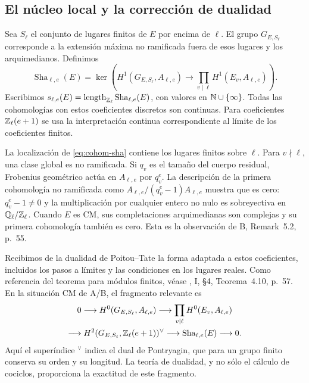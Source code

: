 \subsection{El núcleo local y la corrección de dualidad}

Sea $S_\ell$ el conjunto de lugares finitos de $E$
por encima de $\ell$. El grupo $G_{E,S_\ell}$ corresponde
a la extensión máxima no ramificada fuera de esos lugares
y los arquimedianos. Definimos
\begin{equation}
 \operatorname{Sha}_{\ell,e}(E)=
 \ker\left(
 H^1(G_{E,S_\ell},A_{\ell,e})
 \longrightarrow\prod_{v\mid\ell}H^1(E_v,A_{\ell,e})
 \right).
 \label{eq:cohom-sha}
\end{equation}
Escribimos $s_{\ell,e}(E)=
\operatorname{length}_{\mathbb{Z}_\ell}\operatorname{Sha}_{\ell,e}(E)$,
con valores en $\mathbb{N}\cup\{\infty\}$.
Todas las cohomologías con estos coeficientes discretos
son continuas. Para coeficientes $\mathbb{Z}_\ell(e+1)$ se usa
la interpretación continua correspondiente al límite
de los coeficientes finitos.

La localización de \eqref{eq:cohom-sha} contiene los
lugares finitos sobre $\ell$. Para $v\nmid\ell$,
una clase global es no ramificada. Si $q_v$ es el tamaño
del cuerpo residual, Frobenius geométrico actúa en
$A_{\ell,e}$ por $q_v^e$. La descripción de la primera
cohomología no ramificada como
$A_{\ell,e}/(q_v^e-1)A_{\ell,e}$ muestra que es cero:
$q_v^e-1\ne0$ y la multiplicación por cualquier entero
no nulo es sobreyectiva en $\mathbb{Q}_\ell/\mathbb{Z}_\ell$.
Cuando $E$ es CM, sus completaciones arquimedianas
son complejas y su primera cohomología también es cero.
Esta es la observación de B, Remark~5.2, p.~55.

Recibimos de la dualidad de Poitou--Tate la forma adaptada
a estos coeficientes, incluidos los pasos a límites
y las condiciones en los lugares reales.
Como referencia del teorema para módulos finitos,
véase \cite{milne-dualidad}, I, §4, Teorema~4.10, p.~57.
En la situación CM de A/B, el fragmento relevante es
\begin{equation}
 \begin{gathered}
 0\longrightarrow H^0(G_{E,S_\ell},A_{\ell,e})
 \longrightarrow\prod_{v\mid\ell}H^0(E_v,A_{\ell,e})\\
 \longrightarrow
 H^2(G_{E,S_\ell},\mathbb{Z}_\ell(e+1))^\vee
 \longrightarrow\operatorname{Sha}_{\ell,e}(E)
 \longrightarrow0.
 \end{gathered}
 \label{eq:cohom-dualidad}
\end{equation}
Aquí el superíndice \({}^\vee\) indica el dual
de Pontryagin, que para un grupo finito conserva su
orden y su longitud. La teoría de dualidad, y no sólo
el cálculo de cociclos, proporciona la exactitud
de este fragmento.

